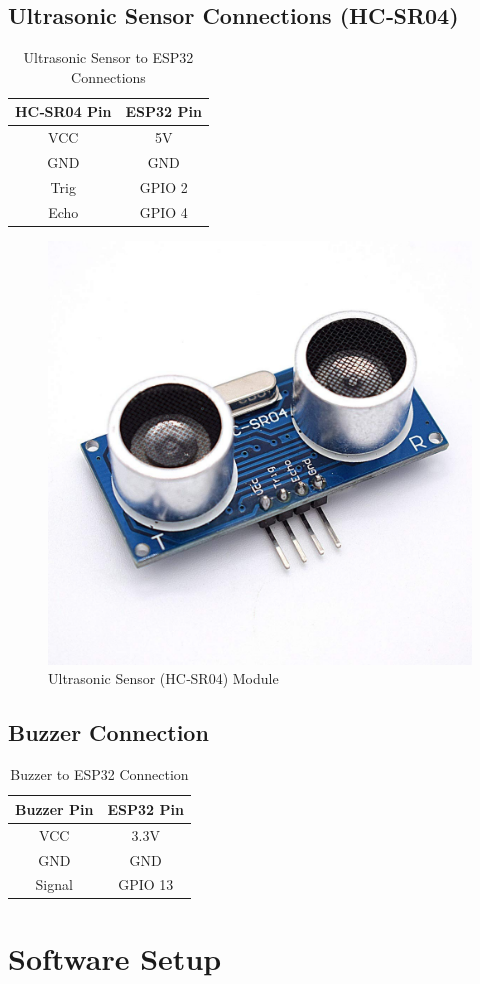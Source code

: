 \documentclass[conference]{IEEEtran}
\begin{document}
\subsection{Ultrasonic Sensor Connections (HC‑SR04)}
\begin{table}[!ht]
\centering
\caption{Ultrasonic Sensor to ESP32 Connections}
\begin{tabular}{|c|c|}
\hline
\textbf{HC‑SR04 Pin} & \textbf{ESP32 Pin} \\
\hline
VCC & 5V \\
GND & GND \\
Trig & GPIO 2 \\
Echo & GPIO 4 \\
\hline
\end{tabular}
\end{table}

\begin{figure}[h!]
\centering
\includegraphics[width=0.4\linewidth]{Ultrasonic.jpg}
\caption{Ultrasonic Sensor (HC‑SR04) Module}
\label{fig:ultrasonic}
\end{figure}

\subsection{Buzzer Connection}
\begin{table}[!ht]
\centering
\caption{Buzzer to ESP32 Connection}
\begin{tabular}{|c|c|}
\hline
\textbf{Buzzer Pin} & \textbf{ESP32 Pin} \\
\hline
VCC    & 3.3V \\
GND    & GND \\
Signal & GPIO 13 \\
\hline
\end{tabular}
\end{table}

\section{Software Setup}
\end{document}
